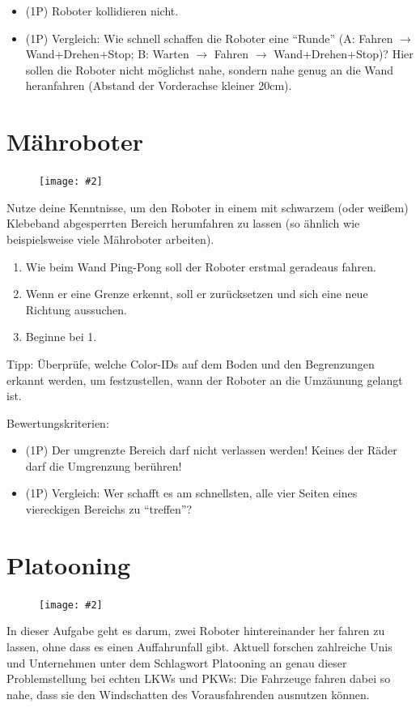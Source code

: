 \documentclass[
	12pt,
	article,
	type=bsc, %
	colorbacktitle,
	instlogo,
	accentcolor=tud1c,
	german,
	twoside
]{tudexercise}
\newcommand{\easygcenter}[2]{
	\begin{figure}[h]
	\centering 
	\texttt{[image: \#2]}
	\end{figure}
}
\begin{document}
	\begin{itemize}
	\item (1P) Roboter kollidieren nicht.
	\item (1P) Vergleich: Wie schnell schaffen die Roboter eine “Runde” (A: Fahren $\rightarrow$ Wand+Drehen+Stop; B: Warten $\rightarrow$ Fahren $\rightarrow$ Wand+Drehen+Stop)? Hier sollen die Roboter nicht möglichst nahe, sondern nahe genug an die Wand heranfahren (Abstand der Vorderachse kleiner 20cm).
	\end{itemize}
	
	\newpage
	\section{Mähroboter}
	\easygcenter{.8\textwidth}{img/task_maehroboter.jpg}
	Nutze deine Kenntnisse, um den Roboter in einem mit schwarzem (oder weißem) Klebeband abgesperrten Bereich herumfahren zu lassen (so ähnlich wie beispielsweise viele Mähroboter arbeiten).
	\begin{enumerate}
	\item Wie beim Wand Ping-Pong soll der Roboter erstmal geradeaus fahren.
	\item Wenn er eine Grenze erkennt, soll er zurücksetzen und sich eine neue Richtung aussuchen.
	\item Beginne bei 1.
	\end{enumerate}
	
	Tipp: Überprüfe, welche Color-IDs auf dem Boden und den Begrenzungen erkannt werden, um festzustellen, wann der Roboter an die Umzäunung gelangt ist.
	
	Bewertungskriterien:
	\begin{itemize}
	\item (1P) Der umgrenzte Bereich darf nicht verlassen werden! Keines der Räder darf die Umgrenzung berühren!
	\item (1P) Vergleich: Wer schafft es am schnellsten, alle vier Seiten eines viereckigen Bereichs zu “treffen”?
	\end{itemize}
	
	\newpage
	\section{Platooning}
	\easygcenter{.8\textwidth}{img/task_platooning.jpg}
	In dieser Aufgabe geht es darum, zwei Roboter hintereinander her fahren zu lassen, ohne dass es einen Auffahrunfall gibt. Aktuell forschen zahlreiche Unis und Unternehmen unter dem Schlagwort Platooning an genau dieser Problemstellung bei echten LKWs und PKWs: Die Fahrzeuge fahren dabei so nahe, dass sie den Windschatten des Vorausfahrenden ausnutzen können.
	
\end{document}
